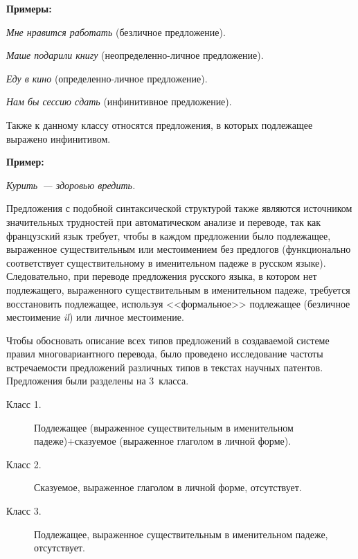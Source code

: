 \begin{multicols}{2}
\smallskip

\noindent
\textbf{Примеры:}
       
     \textit{Мне нравится работать} (безличное предложение).
       
     \textit{Маше подарили книгу} (не\-опре\-де\-лен\-но-лич\-ное 
предложение).
       
     \textit{Еду в кино} (опре\-де\-лен\-но-лич\-ное предложение).
       
     \textit{Нам бы сессию сдать} (инфинитивное предложение).
       
       \smallskip
       
     Также к данному классу относятся предложения, в которых 
подлежащее выражено инфинитивом. 
     
     \smallskip
     
     \noindent
     \textbf{Пример:}
       
     \textit{Курить~--- здоровью вредить.}
       
       \smallskip
       
     Предложения с подобной синтаксической структурой также являются 
источником значительных трудностей при автоматическом анализе и 
переводе, так как французский язык требует, чтобы в каждом предложении 
было подлежащее, выраженное существительным или местоимением без 
предлогов (функционально соответствует существительному в именительном 
падеже в русском языке). Следовательно, при переводе предложения 
русского языка, в котором нет подлежащего, выраженного существительным 
в именительном падеже, требуется восстановить подлежащее, используя 
<<формальное>> подлежащее (безличное местоимение \textit{il}) или личное 
местоимение. 
     
     Чтобы обосновать описание всех типов предложений в создаваемой 
сис\-те\-ме правил многовариантного перевода, было проведено исследование 
частоты встречаемости предложений различных типов в текстах научных 
патентов. Предложения были разделены на 3~класса.
       \begin{description}
     \item[Класс 1.] Подлежащее (выраженное существительным в 
именительном падеже)\;+\;сказуемое (выраженное глаголом в личной форме).
     \item[Класс 2.] Сказуемое, выраженное глаголом в личной форме, 
отсутствует. 
     \item[Класс 3.] Подлежащее, выраженное существительным в 
именительном падеже, отсутствует.
     \end{description}
     

\end{multicols}
